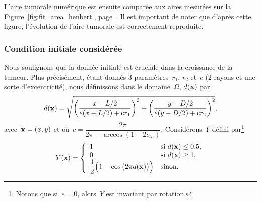\documentclass[main.tex]{subfiles}
\begin{document}
L'aire tumorale numérique est ensuite comparée aux aires mesurées sur la Figure~\ref{fig:fit_area_henbert}, page~\pageref{fig:fit_area_henbert}.  
Il est important de noter que d'après cette 
figure, l'évolution de l'aire tumorale est correctement reproduite. 


\subsubsection{Condition initiale considérée}
Nous soulignons que la donnée initiale est cruciale dans la croissance de la tumeur. 
Plus précisément, étant donnés 3 paramètres~$r_1$, $r_2$ et~$e$ (2 rayons et une sorte d'excentricité), nous définissons dans le domaine~$\Omega$, $d(\mathbf{x})$ par
\begin{equation}\label{cond-ini}
d(\mathbf{x})=\sqrt{\left(\dfrac{ x - L/2 }{e (x - L/2) +
      {\rm c} r_1}\right)^2+\left(\dfrac{ y - D/2 }{e (y -
      D/2 ) + {\rm c} r_2}\right)^2 },
\end{equation}
avec~$\mathbf{x}=(x,y)$ et où~$c=\dfrac{2\pi}{2\pi-\arccos(1-2\epsilon_{th})}$.
Considérons~$Y$ défini par\footnote{Notons que si~$e=0$, alors~$Y$ est  invariant par rotation.}
\begin{equation}Y(\mathbf{x})=\left\{
\begin{array}{ll}
1 & \textrm{si}\ d(\mathbf{x})\leq 0.5,\\
0 & \textrm{si}\ d(\mathbf{x})\geq 1, \\
\dfrac{1}{2}\Big(1-\cos \big(2\pi d(\mathbf{x})\big)\Big)& \textrm{sinon}.
\label{eq:CI_forme}
\end{array}\right.
\end{equation}
\end{document}
